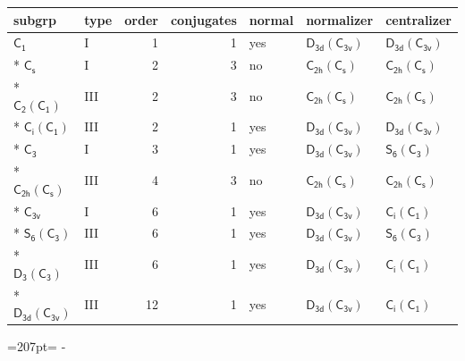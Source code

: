 \documentclass[10pt,a4paper]{article}
\newcommand{\needspace}[1]{\par\penalty-100\begingroup\dimen0=#1\relax\dimen2=\pagegoal
  \advance\dimen2-\pagetotal\ifdim\dimen0>\dimen2\relax\ifdim\dimen2>0pt\vfil\break\fi\fi
  \endgroup}
\numberwithin{equation}{section}
\newcommand{\grp}[1]{\mathsf{#1}}
\begin{document}
{\small\begin{longtable}{@{}llrrlll@{}}\toprule
subgrp & type & order & conjugates & normal & normalizer & centralizer\\\midrule\endhead
\bottomrule\endfoot\endlastfoot
\href{../../../rotation/data/pdf/C1.pdf}{$\grp{C_{1}}$} & I & 1 & 1 & yes & \href{D3d-C3v.pdf}{$\grp{D_{3d}}(\grp{C_{3v}})$} & \href{D3d-C3v.pdf}{$\grp{D_{3d}}(\grp{C_{3v}})$}\\*
\href{../../../rotation/data/pdf/C1v.pdf}{$\grp{C_{s}}$} & I & 2 & 3 & no & \href{C2h-C1v.pdf}{$\grp{C_{2h}}(\grp{C_{s}})$} & \href{C2h-C1v.pdf}{$\grp{C_{2h}}(\grp{C_{s}})$}\\*
\href{C2-C1.pdf}{$\grp{C_{2}}(\grp{C_{1}})$} & III & 2 & 3 & no & \href{C2h-C1v.pdf}{$\grp{C_{2h}}(\grp{C_{s}})$} & \href{C2h-C1v.pdf}{$\grp{C_{2h}}(\grp{C_{s}})$}\\*
\href{S2-C1.pdf}{$\grp{C_{i}}(\grp{C_{1}})$} & III & 2 & 1 & yes & \href{D3d-C3v.pdf}{$\grp{D_{3d}}(\grp{C_{3v}})$} & \href{D3d-C3v.pdf}{$\grp{D_{3d}}(\grp{C_{3v}})$}\\*
\href{../../../rotation/data/pdf/C3.pdf}{$\grp{C_{3}}$} & I & 3 & 1 & yes & \href{D3d-C3v.pdf}{$\grp{D_{3d}}(\grp{C_{3v}})$} & \href{S6-C3.pdf}{$\grp{S_{6}}(\grp{C_{3}})$}\\*
\href{C2h-C1v.pdf}{$\grp{C_{2h}}(\grp{C_{s}})$} & III & 4 & 3 & no & \href{C2h-C1v.pdf}{$\grp{C_{2h}}(\grp{C_{s}})$} & \href{C2h-C1v.pdf}{$\grp{C_{2h}}(\grp{C_{s}})$}\\*
\href{../../../rotation/data/pdf/C3v.pdf}{$\grp{C_{3v}}$} & I & 6 & 1 & yes & \href{D3d-C3v.pdf}{$\grp{D_{3d}}(\grp{C_{3v}})$} & \href{S2-C1.pdf}{$\grp{C_{i}}(\grp{C_{1}})$}\\*
\href{S6-C3.pdf}{$\grp{S_{6}}(\grp{C_{3}})$} & III & 6 & 1 & yes & \href{D3d-C3v.pdf}{$\grp{D_{3d}}(\grp{C_{3v}})$} & \href{S6-C3.pdf}{$\grp{S_{6}}(\grp{C_{3}})$}\\*
\href{D3-C3.pdf}{$\grp{D_{3}}(\grp{C_{3}})$} & III & 6 & 1 & yes & \href{D3d-C3v.pdf}{$\grp{D_{3d}}(\grp{C_{3v}})$} & \href{S2-C1.pdf}{$\grp{C_{i}}(\grp{C_{1}})$}\\*
\href{D3d-C3v.pdf}{$\grp{D_{3d}}(\grp{C_{3v}})$} & III & 12 & 1 & yes & \href{D3d-C3v.pdf}{$\grp{D_{3d}}(\grp{C_{3v}})$} & \href{S2-C1.pdf}{$\grp{C_{i}}(\grp{C_{1}})$}\\
\bottomrule\end{longtable}}
\needspace{207pt}
\end{document}
